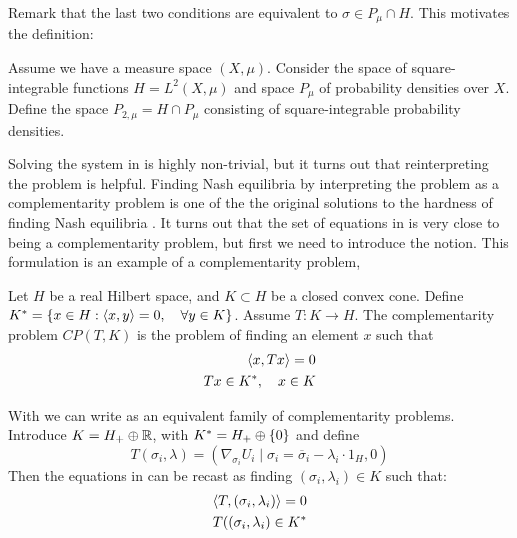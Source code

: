 Remark that the last two conditions are equivalent to $\sigma \in P_{\mu} \cap H$. This motivates the definition:
\begin{definition}
  Assume we have a measure space $(X,\mu)$. Consider the space of square-integrable functions $H=L^2(X,\mu)$ and space $P_{\mu}$ of probability densities over $X$. Define the space $P_{2,\mu}=H \cap P_{\mu}$ consisting of square-integrable probability densities.
\end{definition}
Solving the system in  is highly non-trivial, but it turns out that reinterpreting the problem is helpful.
Finding Nash equilibria by interpreting the problem as a complementarity problem is one of the the original solutions to the hardness of finding Nash equilibria  \citep{karamardian1969nonlinear}. It turns out that the set of equations in  is very close to being a complementarity problem, but first we need to introduce the notion.
 This formulation is an example of a complementarity problem,
\begin{definition}
  \label{def:comp_prob}
  Let $H$ be a real Hilbert space, and $K \subset H$ be a closed convex cone. Define $K^* = \{ x \in H : \left \langle x,y \right \rangle = 0, \quad \forall y\in K\} $. Assume $T:K \to H$. The complementarity problem $CP(T,K)$ is the problem of finding an element $x$ such that
  \begin{equation}
    \begin{split}
    \left \langle x,Tx \right \rangle = 0 \\
    Tx \in K^*, \quad  x\in K
  \end{split}
  \end{equation}
\end{definition}
With  we can write  as an equivalent family of complementarity problems. Introduce $K = H_+ \oplus \mathbb{R}$, with $K^* = H_+ \oplus \{0\}$ and define
\begin{equation}
  T(\sigma_i, \lambda) = (\nabla_{\sigma_i} U_i \mid{\sigma_i = \overbar{\sigma}_i} - \lambda_i \cdot 1_H, 0)
\end{equation}
Then the equations in  can be recast as finding $(\sigma_i,\lambda_i) \in K$ such that:
\begin{equation}
  \label{eq:comp_form}
  \begin{split}
    \left \langle T,(\sigma_i,\lambda_i) \right \rangle = 0 \\
    T((\sigma_i,\lambda_i) \in K^*
  \end{split}
\end{equation}
